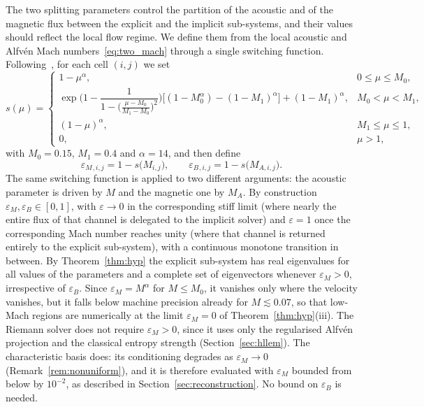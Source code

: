 \documentclass[a4paper,fleqn]{cas-sc}
\theoremstyle{remark}
\newcommand{\eps}{\varepsilon}
\newcommand{\epsM}{\eps_{M}}
\newcommand{\epsB}{\eps_{B}}
\begin{document}
The two splitting parameters control the partition of the acoustic and of the
magnetic flux between the explicit and the implicit sub-systems, and their values
should reflect the local flow regime. We define them from the local acoustic and
Alfv\'en Mach numbers~\eqref{eq:two_mach} through a single switching
function. Following~\cite{NewAP}, for each cell $(i,j)$ we set
\begin{equation}
\label{eq:switch}
s(\mu)=\begin{cases}
1-\mu^{\alpha}, & 0\le\mu\le M_0,\\[4pt]
\exp\!\Big(1-\dfrac{1}{1-\big(\frac{\mu-M_0}{M_1-M_0}\big)^{2}}\Big)
\big[(1-M_0^{\alpha})-(1-M_1)^{\alpha}\big]+(1-M_1)^{\alpha}, & M_0<\mu<M_1,\\[6pt]
(1-\mu)^{\alpha}, & M_1\le\mu\le1,\\[4pt]
0,& \mu>1,
\end{cases}
\end{equation}
with $M_0=0.15$, $M_1=0.4$ and $\alpha=14$, and then define
\begin{equation}
\label{eq:eps_def}
\epsM{}_{,i,j}=1-s\big(M_{i,j}\big),
\qquad
\epsB{}_{,i,j}=1-s\big(M_{A,i,j}\big).
\end{equation}
The same switching function is applied to two different arguments: the
acoustic parameter is driven by $M$ and the magnetic one by $M_A$. By
construction $\epsM,\epsB\in[0,1]$, with $\varepsilon\to0$ in the
corresponding stiff limit (where nearly the entire flux of that channel is
delegated to the implicit solver) and $\varepsilon=1$ once the corresponding
Mach number reaches unity (where that channel is returned entirely to the
explicit sub-system), with a continuous monotone transition in between. By Theorem~\ref{thm:hyp} the explicit sub-system has real eigenvalues for all
values of the parameters and a complete set of eigenvectors whenever
$\epsM>0$, irrespective of $\epsB$. Since $\epsM=M^{\alpha}$ for $M\le M_0$, it
vanishes only where the velocity vanishes, but it falls below machine precision
already for $M\lesssim0.07$, so that low-Mach regions are numerically at the
limit $\epsM=0$ of Theorem~\ref{thm:hyp}(iii). The Riemann solver does not
require $\epsM>0$, since it uses only the regularised Alfv\'en projection and
the classical entropy strength (Section~\ref{sec:hllem}). The characteristic
basis does: its conditioning degrades as $\epsM\to0$
(Remark~\ref{rem:nonuniform}), and it is therefore evaluated with $\epsM$
bounded from below by $10^{-2}$, as described in
Section~\ref{sec:reconstruction}. No bound on $\epsB$ is needed.
\end{document}
